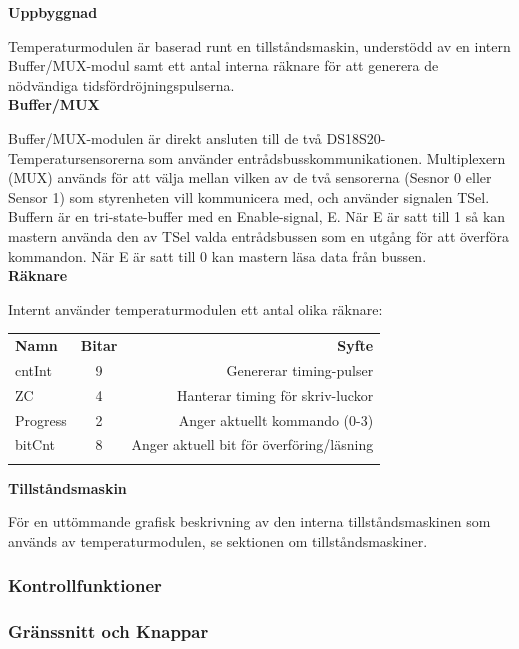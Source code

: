 \documentclass[a4paper,11pt]{article}
\begin{document}
{\noindent \bf Uppbyggnad}

Temperaturmodulen är baserad runt en tillståndsmaskin, understödd av en intern Buffer/MUX-modul samt 
ett antal interna räknare för att generera de nödvändiga tidsfördröjningspulserna.\\

{\noindent \bf Buffer/MUX}

Buffer/MUX-modulen är direkt ansluten till de två DS18S20-Temperatursensorerna som använder entrådsbusskommunikationen.
Multiplexern (MUX) används för att välja mellan vilken av de två sensorerna (Sesnor 0 eller Sensor 1) som styrenheten
vill kommunicera med, och använder signalen TSel.
Buffern är en tri-state-buffer med en Enable-signal, E. När E är satt till 1 så kan mastern använda den av TSel valda
entrådsbussen som en utgång för att överföra kommandon. När E är satt till 0 kan mastern läsa data från bussen.\\

{\noindent \bf Räknare}

Internt använder temperaturmodulen ett antal olika räknare: \\
	\begin{tabular}{l c r}
		\\{\bf Namn} & {\bf Bitar} & {\bf Syfte}\\
		cntInt & 9 & Genererar timing-pulser\\
		ZC & 4 & Hanterar timing för skriv-luckor\\
		Progress & 2 & Anger aktuellt kommando (0-3)\\
		bitCnt & 8 & Anger aktuell bit för överföring/läsning\\\\
	\end{tabular}

{\noindent \bf Tillståndsmaskin}

För en uttömmande grafisk beskrivning av den interna tillståndsmaskinen som används av temperaturmodulen,
se sektionen om tillståndsmaskiner.\\

		\subsubsection{Kontrollfunktioner}

		\subsubsection{Gränssnitt och Knappar}
\end{document}
